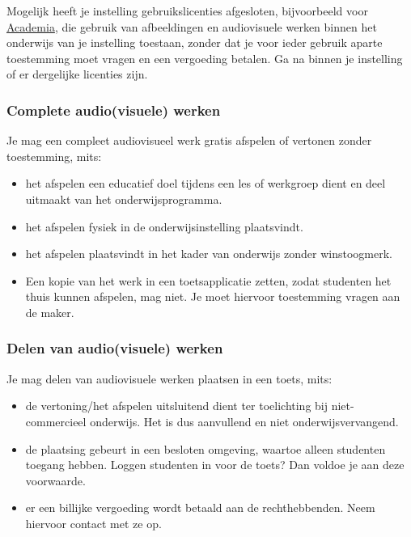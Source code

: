 \documentclass[
]{book}
\providecommand{\tightlist}{%
  \setlength{\itemsep}{0pt}\setlength{\parskip}{0pt}}
\begin{document}
Mogelijk heeft je instelling gebruikslicenties afgesloten, bijvoorbeeld voor \href{https://www.academia.nl}{Academia}, die gebruik van afbeeldingen en audiovisuele werken binnen het onderwijs van je instelling toestaan, zonder dat je voor ieder gebruik aparte toestemming moet vragen en een vergoeding betalen. Ga na binnen je instelling of er dergelijke licenties zijn.

\hypertarget{complete-audiovisuele-werken}{%
\subsubsection{Complete audio(visuele) werken}\label{complete-audiovisuele-werken}}

Je mag een compleet audiovisueel werk gratis afspelen of vertonen zonder toestemming, mits:

\begin{itemize}
\tightlist
\item
  het afspelen een educatief doel tijdens een les of werkgroep dient en deel uitmaakt van het onderwijsprogramma.
\item
  het afspelen fysiek in de onderwijsinstelling plaatsvindt.
\item
  het afspelen plaatsvindt in het kader van onderwijs zonder winstoogmerk.
\item
  Een kopie van het werk in een toetsapplicatie zetten, zodat studenten het thuis kunnen afspelen, mag niet. Je moet hiervoor toestemming vragen aan de maker.
\end{itemize}

\hypertarget{delen-van-audiovisuele-werken}{%
\subsubsection{Delen van audio(visuele) werken}\label{delen-van-audiovisuele-werken}}

Je mag delen van audiovisuele werken plaatsen in een toets, mits:

\begin{itemize}
\tightlist
\item
  de vertoning/het afspelen uitsluitend dient ter toelichting bij niet-commercieel onderwijs. Het is dus aanvullend en niet onderwijsvervangend.
\item
  de plaatsing gebeurt in een besloten omgeving, waartoe alleen studenten toegang hebben. Loggen studenten in voor de toets? Dan voldoe je aan deze voorwaarde.
\item
  er een billijke vergoeding wordt betaald aan de rechthebbenden. Neem hiervoor contact met ze op.
\end{itemize}
\end{document}
